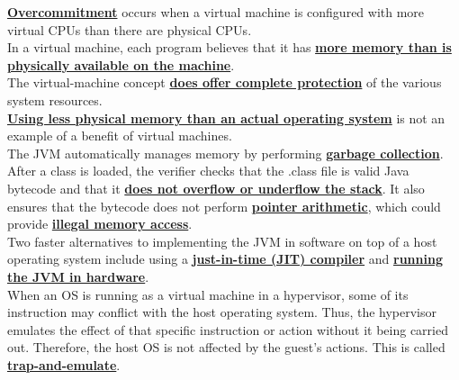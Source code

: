 \documentclass[10pt]{article}
\newcommand{\qw}[1]{\textbf{\ul{#1}}}
\begin{document}
\qw{Overcommitment} occurs when a virtual machine is configured with more virtual CPUs than there are physical CPUs.\\[2mm]
In a virtual machine, each program believes that it has \qw{more memory than is physically available on the machine}.\\[2mm]
The virtual-machine concept \qw{does offer complete protection} of the various system resources.\\[2mm]
\qw{Using less physical memory than an actual operating system} is not an example of a benefit of virtual machines.\\[2mm]
The JVM automatically manages memory by performing \qw{garbage collection}. After a class is loaded, the verifier checks that the .class file is valid Java bytecode and that it \qw{does not overflow or underflow the stack}. It also ensures that the bytecode does not perform \qw{pointer arithmetic}, which could provide \qw{illegal memory access}.\\[2mm]
Two faster alternatives to implementing the JVM in software on top of a host operating system include using a \qw{just-in-time (JIT) compiler} and \qw{running the JVM in hardware}.\\[2mm]
When an OS is running as a virtual machine in a hypervisor, some of its instruction may conflict with the host operating system. Thus, the hypervisor emulates the effect of that specific instruction or action without it being carried out. Therefore, the host OS is not affected by the guest's actions. This is called \qw{trap-and-emulate}.
\newpage
\end{document}
